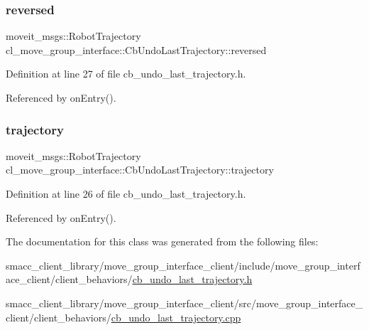 \subsubsection{\texorpdfstring{reversed}{reversed}}
{\footnotesize\ttfamily moveit\+\_\+msgs\+::\+Robot\+Trajectory cl\+\_\+move\+\_\+group\+\_\+interface\+::\+Cb\+Undo\+Last\+Trajectory\+::reversed\hspace{0.3cm}{\ttfamily [private]}}



Definition at line 27 of file cb\+\_\+undo\+\_\+last\+\_\+trajectory.\+h.



Referenced by on\+Entry().

\mbox{\label{classcl__move__group__interface_1_1CbUndoLastTrajectory_ad1fbe6bea21a14596b5c4a6ebf4c775b}} 
\subsubsection{\texorpdfstring{trajectory}{trajectory}}
{\footnotesize\ttfamily moveit\+\_\+msgs\+::\+Robot\+Trajectory cl\+\_\+move\+\_\+group\+\_\+interface\+::\+Cb\+Undo\+Last\+Trajectory\+::trajectory\hspace{0.3cm}{\ttfamily [private]}}



Definition at line 26 of file cb\+\_\+undo\+\_\+last\+\_\+trajectory.\+h.



Referenced by on\+Entry().



The documentation for this class was generated from the following files\+:\begin{DoxyCompactItemize}
\item 
smacc\+\_\+client\+\_\+library/move\+\_\+group\+\_\+interface\+\_\+client/include/move\+\_\+group\+\_\+interface\+\_\+client/client\+\_\+behaviors/\hyperlink{cb__undo__last__trajectory_8h}{cb\+\_\+undo\+\_\+last\+\_\+trajectory.\+h}\item 
smacc\+\_\+client\+\_\+library/move\+\_\+group\+\_\+interface\+\_\+client/src/move\+\_\+group\+\_\+interface\+\_\+client/client\+\_\+behaviors/\hyperlink{cb__undo__last__trajectory_8cpp}{cb\+\_\+undo\+\_\+last\+\_\+trajectory.\+cpp}\end{DoxyCompactItemize}
